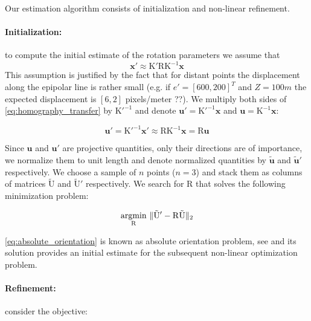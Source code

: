 \documentclass[runningheads]{llncs}
\DeclarePairedDelimiter{\norm}{\lVert}{\rVert}
\begin{document}
Our estimation algorithm consists of initialization and non-linear
refinement.  

\paragraph{Initialization:} to compute the initial estimate of the rotation
parameters we assume that
\begin{equation}\label{eq:homography_transfer}
\mathbf{x}' \approx \mathrm{K'RK^{-1}}\mathbf{x}
\end{equation}
This assumption is justified by the fact that for distant points the
displacement along the epipolar line is rather small (e.g. if $e' =
[600,200]^T$ and $Z = 100m$ the expected displacement is $[6,2]$
pixels/meter ??). We multiply both sides of
\ref{eq:homography_transfer} by $\mathrm{K'^{-1}}$ and denote
$\mathbf{u'} = \mathrm{K'^{-1}}\mathbf{x}$ and $\mathbf{u} =
\mathrm{K^{-1}}\mathbf{x}$:

\begin{equation}
  \mathbf{u'} = \mathrm{K'^{-1}}\mathbf{x}' \approx \mathrm{RK^{-1}}\mathbf{x} = \mathrm{R}\mathbf{u}
\end{equation}

Since $\mathbf{u}$ and $\mathbf{u}'$ are projective quantities, only
their directions are of importance, we normalize them to unit length
and denote normalized quantities by $\mathbf{\tilde{u}}$ and
$\mathbf{\tilde{u}}'$ respectively. We choose a sample of $n$ points
($n=3$) and stack them as columns of matrices $\mathrm{\tilde{U}}$ and
$\mathrm{\tilde{U}'}$ respectively.  We search for $\mathrm{R}$ that
solves the following minimization problem:

\begin{equation}\label{eq:absolute_orientation}
\underset{\mathrm{R}}{\text{argmin}}\ \norm{\mathrm{\tilde{U}'-R\tilde{U}}}_2
\end{equation}

\ref{eq:absolute_orientation} is known as absolute orientation
problem, see \cite{Horn1987} and its solution provides an
initial estimate for the subsequent non-linear optimization
problem.

\paragraph{Refinement:} consider the objective:
\end{document}
